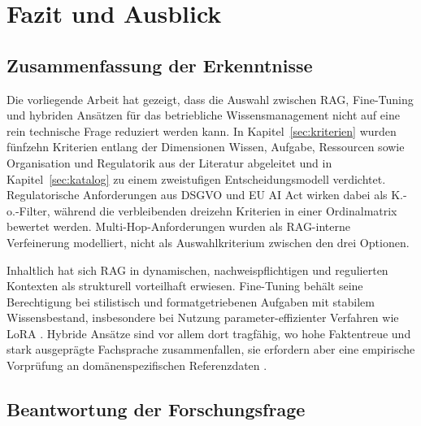 %

\section{Fazit und Ausblick}
\label{sec:fazit}

\subsection{Zusammenfassung der Erkenntnisse}

Die vorliegende Arbeit hat gezeigt, dass die Auswahl zwischen RAG, Fine-Tuning und hybriden Ansätzen für das betriebliche Wissensmanagement nicht auf eine rein technische Frage reduziert werden kann. In Kapitel~\ref{sec:kriterien} wurden fünfzehn Kriterien entlang der Dimensionen Wissen, Aufgabe, Ressourcen sowie Organisation und Regulatorik aus der Literatur abgeleitet und in Kapitel~\ref{sec:katalog} zu einem zweistufigen Entscheidungsmodell verdichtet. Regulatorische Anforderungen aus DSGVO und EU AI Act wirken dabei als K.-o.-Filter, während die verbleibenden dreizehn Kriterien in einer Ordinalmatrix bewertet werden. Multi-Hop-Anforderungen wurden als RAG-interne Verfeinerung modelliert, nicht als Auswahlkriterium zwischen den drei Optionen.

Inhaltlich hat sich RAG in dynamischen, nachweispflichtigen und regulierten Kontexten als strukturell vorteilhaft erwiesen. Fine-Tuning behält seine Berechtigung bei stilistisch und formatgetriebenen Aufgaben mit stabilem Wissensbestand, insbesondere bei Nutzung parameter-effizienter Verfahren wie LoRA \autocite[1]{Hu.2022}. Hybride Ansätze sind vor allem dort tragfähig, wo hohe Faktentreue und stark ausgeprägte Fachsprache zusammenfallen, sie erfordern aber eine empirische Vorprüfung an domänenspezifischen Referenzdaten \autocite[7]{Ovadia.2024}.

\subsection{Beantwortung der Forschungsfrage}


